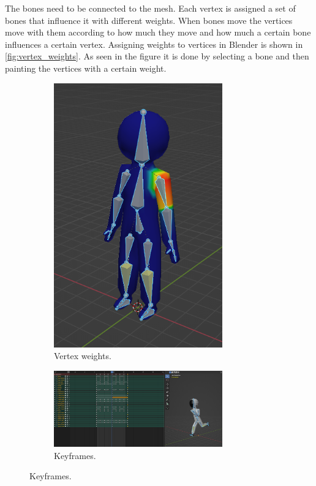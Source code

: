 The bones need to be connected to the mesh.
Each vertex is assigned a set of bones that influence it with different weights.
When bones move the vertices move with them according to how much they move and how much a certain bone influences a certain vertex.
Assigning weights to vertices in Blender is shown in \autoref{fig:vertex_weights}.
As seen in the figure it is done by selecting a bone and then painting the vertices with a certain weight.

\begin{figure}[H]
    \centering
    \begin{subfigure}{0.45\textwidth}
        \centering
        \includegraphics[width=0.8\textwidth]{chapters/theoretical_foundations/sections/models/resources/WeightPaint.png}
        \caption{Vertex weights.}
        \label{fig:vertex_weights}
    \end{subfigure}
    \hfill
    \begin{subfigure}{0.45\textwidth}
        \centering
        \includegraphics[width=0.8\textwidth]{chapters/theoretical_foundations/sections/models/resources/DopeSheet.png}
        \caption{Keyframes.}
        \label{fig:keyframes}
    \end{subfigure}


\end{figure}
